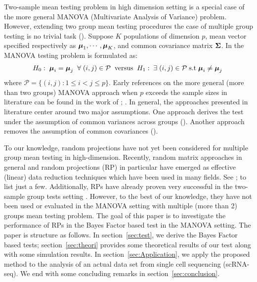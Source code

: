 \documentclass[times,sort&compress,3p]{elsarticle}
\theoremstyle{plain}%
\theoremstyle{definition}
\def\be{\begin{eqnarray}}
\def\ee{\end{eqnarray}}
\newcommand{\umu}               {\mbox{\boldmath$\mu$}}
\newcommand{\uSigma}            {\mbox{\boldmath$\Sigma$}}
\begin{document}
Two-sample mean testing problem in high dimension setting is a special case of the more general MANOVA (Multivariate Analysis of Variance) problem. However, extending two group mean testing procedures the case of multiple group testing is no trivial task (\citealp[]{cai2014high}). Suppose $K$ populations of dimension $p$, mean vector specified respectively as $\umu_1, \cdots, \umu_{K}$, and common covariance matrix $\uSigma$. In the MANOVA testing problem is formulated as:
\be
H_{0}:\; \umu_i = \umu_j\; \; \forall \; (i,j) \in \mathcal{P}\;  \; \mbox{versus} \; \; H_{1}:\; \exists \; (i,j) \in \mathcal{P}\; \mbox{s.t}   \; \umu_i \neq \umu_j\;  \label{eq:test1}
\ee
where $\mathcal{P} = \{(i,j): 1 \leq i < j \leq p  \}$.
Early references on the more general (more than two groups) MANOVA approach when $p$ exceeds the sample sizes in literature can be found in the work of \cite{dempster1958high}; \cite{dempster1960significance}. In general, the approaches presented in literature center around two major assumptions. One approach derives the test under the assumption of common variances across groups (\cite{fujikoshi2004asymptotic}). Another approach removes the assumption of common covariances (\citealp{srivastava2007multivariate}).

To our knowledge, random projections have not yet been considered for multiple group mean testing in high-dimension. Recently, random matrix approaches in general and random projections (RP) in particular have emerged as effective (linear) data reduction techniques which have been used in many fields. See \citealp{wan2020sharp}; \citealp{lopez2021tuning} to list just a few. Additionally, RPs have already proven very successful in the two-sample group tests setting \cite{lopes2011more, srivastava2014raptt,zoh2018powerful}. However, to the best of our knowledge, they have not been used or evaluated in the MANOVA setting with multiple (more than 2) groups mean testing problem. The goal of this paper is to investigate the performance of RPs in the Bayes Factor based test in the MANOVA setting. The paper is structure as follows. In section~\ref{sec:test}, we derive the Bayes Factor based tests; section~\ref{sec:theori} provides some theoretical results of our test along with some simulation results. In section~\ref{sec:Application}, we apply the proposed method to the analysis of an actual data set from single cell sequencing (scRNA-seq). We end with some concluding remarks in section~\ref{sec:conclusion}. 
 
\end{document}
